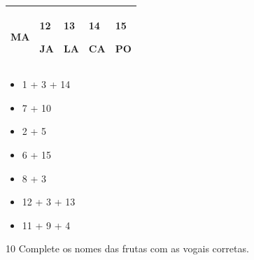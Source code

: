 \begin{longtable}[]{@{}lllll@{}}
\begin{minipage}[t]{0.19\columnwidth}
MA\strut
\end{minipage} & \begin{minipage}[t]{0.19\columnwidth}\raggedright\strut
12

JA\strut
\end{minipage} & \begin{minipage}[t]{0.19\columnwidth}\raggedright\strut
13

LA\strut
\end{minipage} & \begin{minipage}[t]{0.19\columnwidth}\raggedright\strut
14

CA\strut
\end{minipage} & \begin{minipage}[t]{0.19\columnwidth}\raggedright\strut
15

PO\strut
\end{minipage}\tabularnewline
\bottomrule
\end{longtable}

\begin{itemize}
\item 1 + 3 + 14 

\item 7 + 10 \reduline{\mbox{ }\hfill}

\item 2 + 5 \reduline{\mbox{ }\hfill}

\item 6 + 15 \reduline{\mbox{ }\hfill}

\item 8 + 3 \reduline{\mbox{ }\hfill}

\item 12 + 3 + 13 \reduline{\mbox{ }\hfill}

\item 11 + 9 + 4 \reduline{\mbox{ }\hfill}
\end{itemize}

\num{10} Complete os nomes das frutas com as vogais corretas.


